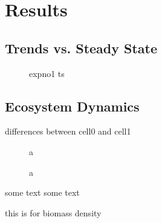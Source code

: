 \chapter{Results}
\label{chap:res}


\section{Trends vs. Steady State}
\label{chap:res:dyn:trend}

\begin{figure}
\centering

\caption[Body mass density time series for experiment 1]{expno1 ts}
\label{fig:chap:res:ts:expno1}
\end{figure}

\begin{figure}
\centering

\caption[ShortCap]{}
\label{fig:chap:res:tsinit}
\end{figure}


\section{Ecosystem Dynamics}
\label{chap:res:dyn} 
differences between cell0 and cell1

\begin{figure}
\centering

\caption[Average body mass (aseasonal system)]{a}
\label{fig:chap:res:dyn:avg}
\end{figure}


\begin{figure}
\centering

\caption{a}
\label{fig:chap:res:dyn}
\end{figure}


some text some text




this is for biomass density



